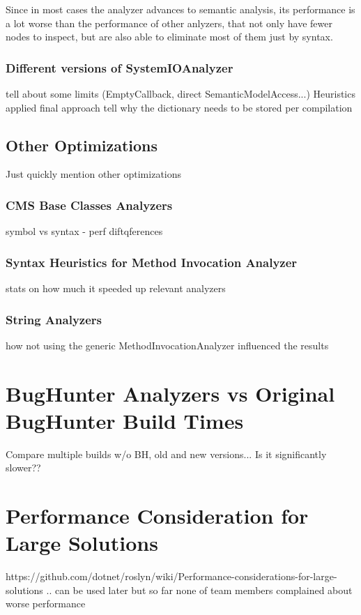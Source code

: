 \documentclass[
  digital, %
  table,   %
  lof,     %
  lot,     %
  oneside,
]{fithesis3}
\begin{document}
Since in most cases the analyzer advances to semantic analysis, its performance is a lot worse than the performance of other anlyzers, that not only have fewer nodes to inspect, but are also able to eliminate most of them just by syntax.

\subsubsection{\textbf{Different versions of SystemIOAnalyzer}}
tell about some limits (EmptyCallback, direct SemanticModelAccess...)
Heuristics applied
final approach
tell why the dictionary needs to be stored per compilation
\subsection{Other Optimizations}
Just quickly mention other optimizations 

\subsubsection{\textbf{CMS Base Classes Analyzers}}
symbol vs syntax - perf diftqferences

\subsubsection{\textbf{Syntax Heuristics for Method Invocation Analyzer}}
stats on how much it speeded up relevant analyzers

\subsubsection{\textbf{String Analyzers}}
how not using the generic MethodInvocationAnalyzer influenced the results

\section{BugHunter Analyzers vs Original BugHunter Build Times}
Compare multiple builds w/o BH, old and new versions... Is it significantly slower??

\section{Performance Consideration for Large Solutions}
https://github.com/dotnet/roslyn/wiki/Performance-considerations-for-large-solutions
.. can be used later but so far none of team members complained about worse performance
\end{document}
